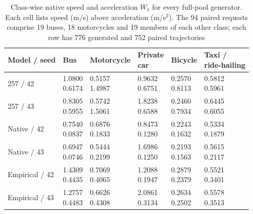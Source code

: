 \begin{table}[htbp]
\centering
\caption{Class-wise native speed and acceleration $W_1$ for every full-pool generator. Each cell lists speed (m/s) above acceleration (m/s$^2$). The 94 paired requests comprise 19 buses, 18 motorcycles and 19 members of each other class; each row has 776 generated and 752 paired trajectories}
\label{tab:g33-class-native}
\small
\setlength{\tabcolsep}{3pt}
\renewcommand{\arraystretch}{1.2}
\begin{tabularx}{\linewidth}{@{}l*{5}{>{\centering\arraybackslash}X}@{}}
\toprule
Model / seed & Bus & Motorcycle & \shortstack{Private\\car} & Bicycle & \shortstack{Taxi /\\ride-hailing}\\
\midrule
257 / 42 & \shortstack{1.0800\\0.6174} & \shortstack{0.5157\\1.4987} & \shortstack{0.9632\\0.6751} & \shortstack{0.2570\\0.8113} & \shortstack{0.5812\\0.5961}\\
257 / 43 & \shortstack{0.8305\\0.5955} & \shortstack{0.5742\\1.5061} & \shortstack{1.8238\\0.6588} & \shortstack{0.2460\\0.7934} & \shortstack{0.6445\\0.6055}\\
Native / 42 & \shortstack{0.7540\\0.0837} & \shortstack{0.6876\\0.1833} & \shortstack{0.8473\\0.1280} & \shortstack{0.2243\\0.1632} & \shortstack{0.5334\\0.1879}\\
Native / 43 & \shortstack{0.6947\\0.0746} & \shortstack{0.5444\\0.2199} & \shortstack{1.6986\\0.1250} & \shortstack{0.2193\\0.1563} & \shortstack{0.5615\\0.2117}\\
Empirical / 42 & \shortstack{1.4309\\0.4435} & \shortstack{0.7069\\0.4065} & \shortstack{1.2088\\0.1947} & \shortstack{0.2879\\0.2379} & \shortstack{0.5521\\0.3401}\\
Empirical / 43 & \shortstack{1.2757\\0.4483} & \shortstack{0.6626\\0.4308} & \shortstack{2.0861\\0.3134} & \shortstack{0.2634\\0.2502} & \shortstack{0.5578\\0.3513}\\
\bottomrule
\end{tabularx}
\end{table}

